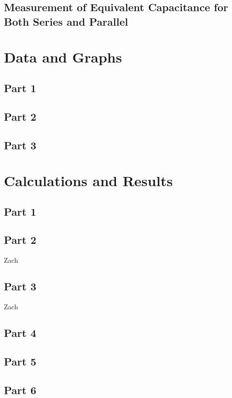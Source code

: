 \documentclass[titlepage]{article}
\begin{document}
        \subsection{Measurement of Equivalent Capacitance for Both Series and Parallel}



	\section{Data and Graphs}
	    \subsection{Part 1}
	    \subsection{Part 2} 
	    \subsection{Part 3}

    \section{Calculations and Results}

        \subsection{Part 1} 

        \subsection{Part 2} 
        Zach

        \subsection{Part 3} 
        Zach

        \subsection{Part 4} 
        \subsection{Part 5} 
        \subsection{Part 6} 
\end{document}

